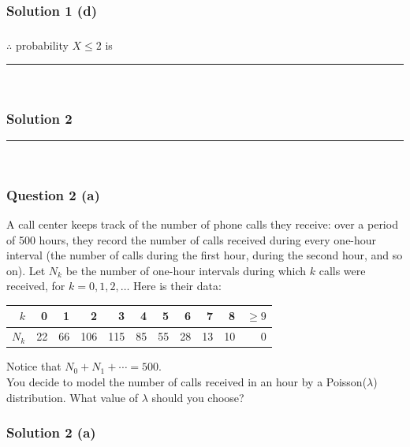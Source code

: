 \documentclass{article}
\begin{document}
\subsubsection*{Solution 1 (d)}


\subsubsection*{\normalfont}{$\therefore$ probability $X \leq 2$ is} \\

\noindent\rule{\textwidth}{0.4pt}\\

\newpage

\subsubsection*{Solution 2}
\noindent\rule{\textwidth}{0.4pt}\\
\subsubsection*{Question 2 (a)}
\begin{flushleft}
    A call center keeps track of the number of phone calls they receive: over a period of 500 hours, they record the number of calls received during every one-hour interval (the number of calls during the first hour, during the second hour, and so on). Let $N_{k}$ be the number of one-hour intervals during which $k$ calls were received, for $k=0,1,2, \ldots$ Here is their data:
\end{flushleft}
\begin{table}[h]
\centering
\begin{tabular}{r|rrrrrrrrrr}
$k$ & 0 & 1 & 2 & 3 & 4 & 5 & 6 & 7 & 8 & $\geq 9$ \\
\midrule
$N_{k}$ & 22 & 66 & 106 & 115 & 85 & 55 & 28 & 13 & 10 & 0 \\
\end{tabular}
\end{table}

\begin{flushleft}
    Notice that $N_{0}+N_{1}+\cdots=500$.\\
    You decide to model the number of calls received in an hour by a Poisson($\lambda$) distribution. What value of $\lambda$ should you choose?
\end{flushleft}
\subsubsection*{Solution 2 (a)}
\end{document}

